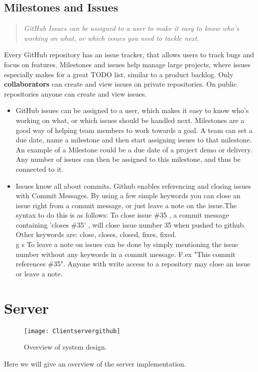 \subsection{Milestones and Issues}
\begin{quote}
\em GitHub Issues can be assigned to a user to make it easy to know who's working on what, or which issues you need to tackle next.
\end{quote}
Every GitHub repository has an issue tracker, that allows users to track bugs and focus on features. Milestones and issues help manage large projects, where issues especially makes for a great TODO list, similar to a product backlog. Only {\bf collaborators} can create and view issues on private repositories. On public repositories anyone can create and view issues. 
\begin{itemize}
\item GitHub issues can be assigned to a user, which makes it easy to know who's working on what, or which issues should be handled next. Milestones are a good way of helping team members to work towards a goal. A team can set a due date, name a milestone and then start assigning issues to that milestone. An example of a Milestone could be a due date of a project demo or delivery. Any number of issues can then be assigned to this milestone, and thus be connected to it. 
\item Issues know all about commits. Github enables referencing and closing issues with Commit Messages. By using a few simple keywords you can close an issue right from a commit message, or just leave a note on the issue.The syntax to do this is as follows: To close issue \#35 , a commit message containing 'closes \#35' , will close issue number 35 when pushed to github. Other keywords are: close, closes, closed, fixes, fixed. \\g s
To leave a note on issues can be done by simply mentioning the issue number without any keywords in a commit message. F.ex "This commit references \#35". Anyone with write access to a repository may close an issue or leave a note.
\end{itemize}

\section{Server}
\begin{figure}[h!]
\label{newnotification}
\centering
    \texttt{[image: Clientservergithub]}
\caption{Overview of system design.}
\end{figure}
Here we will give an overview of the server implementation.


